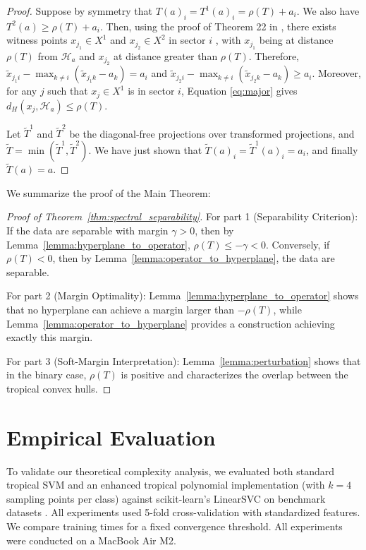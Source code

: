 \documentclass{article}
\begin{document}
\begin{proof}
Suppose by symmetry that $T(a)_{i}=T^{1}(a)_{i}=\rho(T)+a_{i}$. We
also have $T^{2}(a)\ge\rho(T)+a_{i}$. Then, using the proof of Theorem
22 in \cite{akian2020}, there exists witness points $x_{j_{1}}\in X^{1}$ and
$x_{j_{2}}\in X^{2}$ in sector $i$ , with $x_{j_{1}}$ being at
distance $\rho(T)$ from $\mathcal{H}_{a}$ and $x_{j_{2}}$ at distance
greater than $\rho(T)$. Therefore, $\tilde{x}_{j_{1}i}-\max_{k\ne i}(\tilde{x}_{j_{1}k}-a_{k})=a_{i}$
and $\tilde{x}_{j_{2}i}-\max_{k\ne i}(\tilde{x}_{j_{2}k}-a_{k})\ge a_{i}$.
Moreover, for any $j$ such that $x_{j}\in X^1$ is in sector $i$,
Equation \ref{eq:major} gives $d_{H}(x_{j},\mathcal{H}_{a})\le\rho(T)$.

Let $\tilde{T}^{1}$ and $\tilde{T}^{2}$ be the diagonal-free projections
over transformed projections, and $\tilde{T}=\min(\tilde{T}^{1},\tilde{T}^{2})$.
We have just shown that $\tilde{T}(a)_{i}=\tilde{T}^{1}(a)_{i}=a_{i}$,
and finally $\tilde{T}(a)=a$.
\end{proof}

We summarize the proof of the Main Theorem:

\begin{proof}[Proof of Theorem~\ref{thm:spectral_separability}]
For part 1 (Separability Criterion): If the data are separable with margin $\gamma > 0$, then by Lemma~\ref{lemma:hyperplane_to_operator}, $\rho(T) \leq -\gamma < 0$. Conversely, if $\rho(T) < 0$, then by Lemma~\ref{lemma:operator_to_hyperplane}, the data are separable.

For part 2 (Margin Optimality): Lemma~\ref{lemma:hyperplane_to_operator} shows that no hyperplane can achieve a margin larger than $-\rho(T)$, while Lemma~\ref{lemma:operator_to_hyperplane} provides a construction achieving exactly this margin.

For part 3 (Soft-Margin Interpretation): Lemma~\ref{lemma:perturbation} shows that in the binary case, $\rho(T)$ is positive and characterizes the overlap between the tropical convex hulls.
\end{proof}

\section{Empirical Evaluation}\label{appendix:empirical}

To validate our theoretical complexity analysis, we evaluated both standard tropical SVM and an enhanced tropical polynomial implementation (with $k=4$ sampling points per class) against scikit-learn's LinearSVC on benchmark datasets \cite{scikit-learn,waveform_database_generator_(version_1)_107}. All experiments used 5-fold cross-validation with standardized features. We compare training times for a fixed convergence threshold. All experiments were conducted on a MacBook Air M2.
\end{document}
